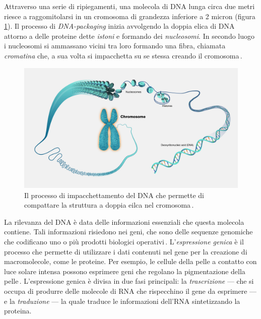 Attraverso una serie di ripiegamenti, una molecola di DNA lunga circa due metri riesce a raggomitolarsi in un cromosoma di grandezza inferiore a 2 micron (figura\,\ref{fig:dna-packaging}). Il processo di \textit{DNA-packaging} inizia avvolgendo la doppia elica di DNA attorno a delle proteine dette \textsl{istoni} e formando dei \textsl{nucleosomi}. In secondo luogo i nucleosomi si ammassano vicini tra loro formando una fibra, chiamata \textsl{cromatina} che, a sua volta si impacchetta su se stessa creando il cromosoma\,\cite{jansen2011nucleosome, zheng2010packaging}.

\begin{figure}[b!]
    \centering
    \includegraphics[width=\textwidth]{assets/dna-packaging.jpg}
    \caption[Il processo di impacchettamento del DNA.]{Il processo di impacchettamento del DNA che permette di compattare la struttura a doppia eilca nel cromosoma\,\cite{nhgri_chromosome_image}.}\label{fig:dna-packaging}
\end{figure}

La rilevanza del DNA è data delle informazioni essenziali che questa molecola contiene. Tali informazioni risiedono nei geni, che sono delle sequenze genomiche che codificano uno o più prodotti biologici operativi\,\cite{gerstein2007gene}. L'\textsl{espressione genica} è il processo che permette di utilizzare i dati contenuti nel gene per la creazione di macromolecole, come le proteine. Per esempio, le cellule della pelle a contatto con luce solare intensa possono esprimere geni che regolano la pigmentazione della pelle\,\cite{white2009gene}. L'espressione genica è divisa in due fasi principali: la \textsl{trascrizione} — che si occupa di produrre delle molecole di RNA che rispecchino il gene da esprimere — e la \textsl{traduzione} — la quale traduce le informazioni dell'RNA sintetizzando la proteina.

